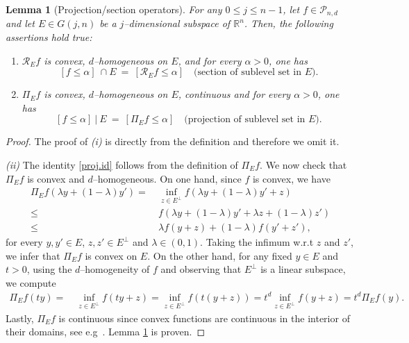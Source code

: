 \documentclass[11pt]{article}
\newtheorem{lemma}[theorem]{Lemma}
\theoremstyle{definition}
\numberwithin{equation}{section}
\newcommand{\R}{\mathbb{R}}
\newcommand{\cP}{\mathcal{P}}        %
\begin{document}
\begin{lemma}[Projection/section operators]\label{prop.pro-sec}
For any $0 \leq j \leq n - 1$, let $f\in\cP_{n,d}$ and let $E \in G(j, n)$ be a $j$--dimensional subspace of $\R^n$.
Then, the following assertions hold true:
\begin{enumerate}[label=(\roman*)]
\item $\mathscr R_E f$ is convex, $d$–homogeneous on $E$, and for every $\alpha > 0$, one has
\begin{equation}\label{sec.id}
[f\le \alpha]\ \cap E\ =\ [\mathscr R_E f\le \alpha]\quad\text{(section of sublevel set in $E$).}
\end{equation}

\item $\Pi_E f$ is convex, $d$–homogeneous on $E$, continuous and for every $\alpha > 0$, one has
\begin{equation}\label{proj.id}
[f\le \alpha]\ \big|\ E\ =\ [\Pi_E f\le \alpha]\quad\text{(projection of sublevel set in $E$).}
\end{equation}
\end{enumerate}
\end{lemma}
\begin{proof}
The proof of \textit{(i)} is directly from the definition and therefore we omit it.
\smallskip

\textit{(ii)}
The identity \eqref{proj.id} follows from the definition of $\Pi_E f$.
We now check that $\Pi_E f$ is convex and $d$--homogeneous.
On one hand, since $f$ is convex, we have
\begin{align*}
    \Pi_E f(\lambda y + (1 - \lambda) y') = & ~ \inf_{z \in E^\perp} f(\lambda y + (1 - \lambda) y' + z) \\
    \leq & ~ f(\lambda y + (1 - \lambda) y' + \lambda z + (1  - \lambda) z') \\
    \leq & ~ 
    \lambda f(y + z) + (1 - \lambda) f(y' + z'),
\end{align*}
for every $y, y' \in E$, $z, z' \in E^\perp$ and $\lambda \in (0, 1)$.
Taking the infimum w.r.t $z$ and  $z'$, we infer that $\Pi_E f$ is convex on $E$.
On the other hand, for any fixed $y \in E$ and $t > 0$, using the $d$--homogeneity of $f$ and observing that $E^\perp$ is a linear subspace, we compute
\begin{align*}
    \Pi_E f(t y) = & ~ \inf_{z \in E^\perp} f(t y + z) = \inf_{z \in E^\perp} f(t(y + z)) = t^d \inf_{z \in E^\perp} f(y + z) = t^d \Pi_E f(y).
\end{align*}
Lastly, $\Pi_E f$ is continuous since convex functions are continuous in the interior of their domains, see e.g~\cite[Proposition 1.19]{P_1989}. 
Lemma \ref{prop.pro-sec} is proven.
\end{proof}
\end{document}

